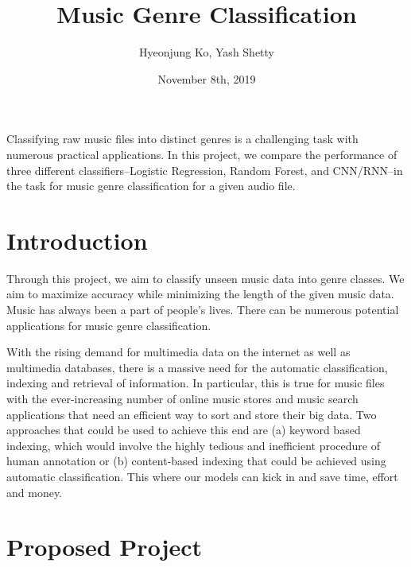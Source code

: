 \documentclass[12pt]{article}
\title{Music Genre Classification}
\author{Hyeonjung Ko, Yash Shetty}
\date{November 8th, 2019}
\begin{document}
\maketitle

\abstract
Classifying raw music files into distinct genres is a challenging task with numerous practical applications. In this project, we compare the performance of three different classifiers–Logistic Regression, Random Forest, and CNN/RNN–in the task for music genre classification for a given audio file.

\section{Introduction}
Through this project, we aim to classify unseen music data into genre classes. We aim to maximize accuracy while minimizing the length of the given music data. Music has always been a part of people's lives. There can be numerous potential applications for music genre classification.

With the rising demand for multimedia data on the internet as well as multimedia databases, there is a massive need for the automatic classification, indexing and retrieval of information. In particular, this is true for music files with the ever-increasing number of online music stores and music search applications that need an efficient way to sort and store their big data. Two approaches that could be used to achieve this end are (a) keyword based indexing, which would involve the highly tedious and inefficient procedure of human annotation or (b) content-based indexing that could be achieved using automatic classification. This where our models can kick in and save time, effort and money.


\section{Proposed Project}
\end{document}
